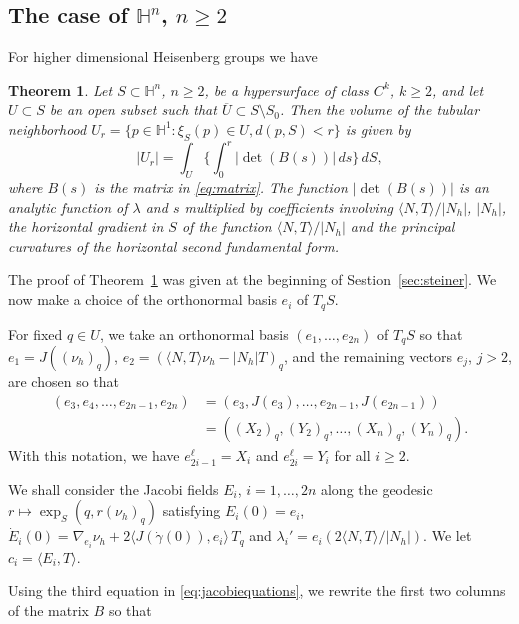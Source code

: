 \documentclass[10pt]{amsart}
\newtheorem{theorem}{Theorem}[section]
\theoremstyle{definition}
\theoremstyle{remark}
\numberwithin{equation}{section}
\begin{document}
\subsection{The case of ${{\mathbb{H}}}^n$, $n{\geqslant} 2$}

For higher dimensional Heisenberg groups we have

\begin{theorem}
\label{thm:steiner2}
Let $S\subset{{\mathbb{H}}}^n$, $n{\geqslant} 2$, be a hypersurface of class $C^k$, $k{\geqslant} 2$, and let $U\subset S$ be an open subset such that $\overline{U}\subset S\setminus S_0$. Then the volume of the tubular neighborhood $U_r=\{p\in{{\mathbb{H}}}^1:\xi_S(p)\in U, d(p,S)<r\}$ is given by
\begin{equation}
|U_r|=\int_U\bigg\{ \int_0^r |\det(B(s))|\,ds\bigg\}\,dS,
\end{equation}
where $B(s)$ is the matrix in \eqref{eq:matrix}. The function $|\det(B(s))|$ is an analytic function of ${\lambda}$ and $s$ multiplied by coefficients involving ${\langle{N,T}\rangle}/{|N_{h}|}$, ${|N_{h}|}$, the horizontal gradient in $S$ of the function ${\langle{N,T}\rangle}/{|N_{h}|}$ and the principal curvatures of the horizontal second fundamental form.
\end{theorem}

The proof of Theorem~\ref{thm:steiner2} was given at the beginning of Sestion~\ref{sec:steiner}. We now make a choice of the orthonormal basis $e_i$ of $T_qS$.

For fixed $q\in U$, we take an orthonormal basis $(e_1,\ldots,e_{2n})$  of $T_qS$ so that $e_1=J(({\nu_{h}})_q)$, $e_2=({\langle{N,T}\rangle}{\nu_{h}}-|N_h|T)_q$, and the remaining vectors $e_j$, $j>2$, are chosen so that
\begin{align*}
(e_3,e_4,\ldots,e_{2n-1},e_{2n})&=(e_3,J(e_3),\ldots,e_{2n-1},J(e_{2n-1}))
\\
&=((X_2)_q,(Y_2)_q,\dots,(X_n)_q,(Y_n)_q).
\end{align*}
With this notation, we have $e_{2i-1}^\ell=X_i$ and $e_{2i}^\ell=Y_i$ for all $i{\geqslant} 2$.

We shall consider the Jacobi fields $E_i$, $i=1,\ldots,2n$ along the geodesic $r\mapsto \exp_S(q,r({\nu_{h}})_q)$ satisfying $E_i(0)=e_i$, $\dot{E}_i(0)=\nabla_{e_i}{\nu_{h}}+2{\langle{J({\dot{\gamma}}(0)),e_i}\rangle}\,T_q$ and ${\lambda}_i'=e_i(2{\langle{N,T}\rangle}/{|N_{h}|})$. We let $c_i={\langle{E_i,T}\rangle}$.

Using the third equation in \eqref{eq:jacobiequations}, we rewrite the first two columns of the matrix $B$ so that
\end{document}

